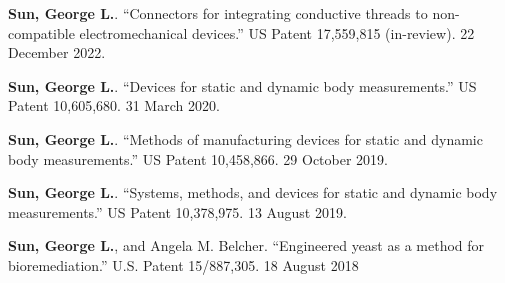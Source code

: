 
\begin{cvparagraph}
\textbf{Sun, George L.}. ``Connectors for integrating conductive threads to non-compatible electromechanical devices.'' US Patent 17,559,815 (in-review). 22 December 2022.

\textbf{Sun, George L.}. ``Devices for static and dynamic body measurements.'' US Patent 10,605,680. 31 March 2020.

\textbf{Sun, George L.}. ``Methods of manufacturing devices for static and dynamic body measurements.'' US Patent 10,458,866. 29 October 2019.

\textbf{Sun, George L.}. ``Systems, methods, and devices for static and dynamic body measurements.'' US Patent 10,378,975. 13 August 2019.

\textbf{Sun, George L.}, and Angela M. Belcher. ``Engineered yeast as a method for bioremediation.'' U.S. Patent 15/887,305. 18 August 2018

\end{cvparagraph}
